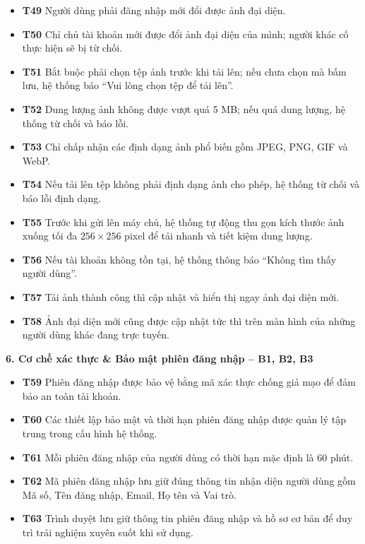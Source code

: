 \documentclass[11pt,a4paper]{article}
\begin{document}
\begin{itemize}[leftmargin=0.9cm, label=$\bullet$, itemsep=2pt, topsep=4pt]
    \item \textbf{T49} Người dùng phải đăng nhập mới đổi được ảnh đại diện.
    \item \textbf{T50} Chỉ chủ tài khoản mới được đổi ảnh đại diện của mình; người khác cố thực hiện sẽ bị từ chối.
    \item \textbf{T51} Bắt buộc phải chọn tệp ảnh trước khi tải lên; nếu chưa chọn mà bấm lưu, hệ thống báo ``Vui lòng chọn tệp để tải lên''.
    \item \textbf{T52} Dung lượng ảnh không được vượt quá 5 MB; nếu quá dung lượng, hệ thống từ chối và báo lỗi.
    \item \textbf{T53} Chỉ chấp nhận các định dạng ảnh phổ biến gồm JPEG, PNG, GIF và WebP.
    \item \textbf{T54} Nếu tải lên tệp không phải định dạng ảnh cho phép, hệ thống từ chối và báo lỗi định dạng.
    \item \textbf{T55} Trước khi gửi lên máy chủ, hệ thống tự động thu gọn kích thước ảnh xuống tối đa $256\times 256$ pixel để tải nhanh và tiết kiệm dung lượng.
    \item \textbf{T56} Nếu tài khoản không tồn tại, hệ thống thông báo ``Không tìm thấy người dùng''.
    \item \textbf{T57} Tải ảnh thành công thì cập nhật và hiển thị ngay ảnh đại diện mới.
    \item \textbf{T58} Ảnh đại diện mới cũng được cập nhật tức thì trên màn hình của những người dùng khác đang trực tuyến.
\end{itemize}
\smallskip
\noindent\textbf{6. Cơ chế xác thực \& Bảo mật phiên đăng nhập -- B1, B2, B3}
\begin{itemize}[leftmargin=0.9cm, label=$\bullet$, itemsep=2pt, topsep=4pt]
    \item \textbf{T59} Phiên đăng nhập được bảo vệ bằng mã xác thực chống giả mạo để đảm bảo an toàn tài khoản.
    \item \textbf{T60} Các thiết lập bảo mật và thời hạn phiên đăng nhập được quản lý tập trung trong cấu hình hệ thống.
    \item \textbf{T61} Mỗi phiên đăng nhập của người dùng có thời hạn mặc định là 60 phút.
    \item \textbf{T62} Mã phiên đăng nhập lưu giữ đúng thông tin nhận diện người dùng gồm Mã số, Tên đăng nhập, Email, Họ tên và Vai trò.
    \item \textbf{T63} Trình duyệt lưu giữ thông tin phiên đăng nhập và hồ sơ cơ bản để duy trì trải nghiệm xuyên suốt khi sử dụng.
\end{itemize}
\end{document}
